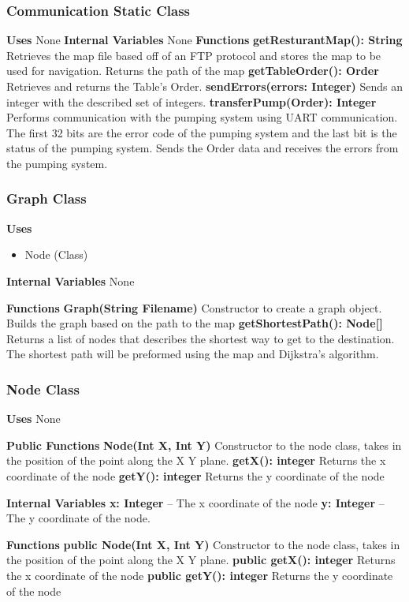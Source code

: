 \documentclass [10pt]{article}
\begin{document}
\subsubsection{Communication Static Class}
\textbf{Uses}
None 
\textbf{Internal Variables}
None 
\textbf{Functions}
\textbf{getResturantMap(): String}
Retrieves the map file based off of an FTP protocol and stores the map to be used for navigation. Returns the path of the map 
\textbf{getTableOrder(): Order}
Retrieves and returns the Table’s Order.
\textbf{sendErrors(errors: Integer)}
 Sends an integer with the described set of integers. 
\textbf{transferPump(Order): Integer}
 Performs communication with the pumping system using UART communication. The first 32 bits are the error code of the pumping system and the last bit is the status of the pumping system. Sends the Order data and receives the errors from the pumping system.

\subsubsection{Graph Class}
\textbf{Uses}
\begin{itemize}
	\item Node (Class)
\end{itemize}

\textbf{Internal Variables}
None 

\textbf{Functions}
\textbf{Graph(String Filename)}
Constructor to create a graph object. Builds the graph based on the path to the map
\textbf{getShortestPath(): Node[]}
Returns a list of nodes that describes the shortest way to get to the destination.  The shortest path will be preformed using the map and Dijkstra’s algorithm.


\subsubsection{Node Class}
\textbf{Uses}
None 

\textbf{Public Functions}
\textbf{Node(Int X, Int Y)}
Constructor to the node class, takes in the position of the point along the X Y plane.
\textbf{getX(): integer}
Returns the x coordinate of the node
\textbf{getY(): integer}
Returns the y coordinate of the node

\textbf{Internal Variables}
\textbf{x: Integer} – The x coordinate of the node
\textbf{y: Integer} – The y coordinate of the node.

\textbf{Functions}
\textbf{public Node(Int X, Int Y)}
Constructor to the node class, takes in the position of the point along the X Y plane.
\textbf{public getX(): integer}
Returns the x coordinate of the node
\textbf{public getY(): integer}
Returns the y coordinate of the node
\end{document}

